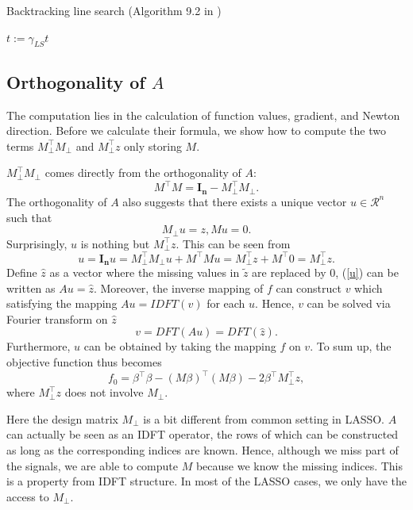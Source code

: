\documentclass[final,onefignum,onetabnum]{siamart190516}
\begin{document}
\begin{algorithm}[H]
\caption{Backtracking line search (Algorithm 9.2 in \cite{boyd2004convex})}
\label{alg: Backtrackingls}
\begin{algorithmic}
\STATE $t:=\gamma_{LS} t$
\ENDWHILE
\end{algorithmic}
\end{algorithm}
\subsection{Orthogonality of $A$}
The computation lies in the calculation of function values, gradient, and Newton direction. Before we calculate their formula, we show how to compute the two terms $M_{\perp}^{\top}M_{\perp}$ and $M_{\perp}^{\top}z$ only storing $M$.

$M_{\perp}^{\top}M_{\perp}$ comes directly from the orthogonality of $A$:
\begin{equation}
    M^{\top}M = \mathbf{I_n} -  M_{\perp}^{\top}M_{\perp}.
\end{equation}
The orthogonality of $A$ also suggests that there exists a unique vector $u\in \mathcal{R}^{n}$ such that
\begin{equation}\label{u}
    M_{\perp}u = z, Mu = 0.
\end{equation}
Surprisingly, $u$ is nothing but $M_{\perp}^{\top}z$. This can be seen from
\begin{equation}
    u = \mathbf{I_n}u = M_{\perp}^{\top} M_{\perp}u +  M^{\top}Mu = M_{\perp}^{\top}z + M^{\top}0 = M_{\perp}^{\top}z.
\end{equation}
Define $\widehat{z}$ as a vector where the missing values in $\widetilde{z}$ are replaced by 0, (\ref{u}) can be written as $Au = \widehat{z}$. Moreover, the inverse mapping of $f$ can construct $v$ which satisfying the mapping $Au = IDFT(v)$ for each $u$. Hence, $v$ can be solved via Fourier transform on $\widehat{z}$
\begin{equation}
    v = DFT(Au) = DFT(\widehat{z}).
\end{equation}
Furthermore, $u$ can be obtained by taking the mapping $f$ on $v$. To sum up, the objective function thus becomes
\begin{equation}
    f_0 = \beta^{\top}\beta - (M\beta)^{\top}(M\beta) -2\beta^{\top}M_{\perp}^{\top}z,
\end{equation}
where $M_{\perp}^{\top}z$ does not involve $M_{\perp}$.
\begin{remark}
Here the design matrix $M_{\perp}$ is a bit different from common setting in LASSO. $A$ can actually be seen as an IDFT operator, the rows of which can be constructed as long as the corresponding indices are known. Hence, although we miss part of the signals, we are able to compute $M$ because we know the missing indices. This is a property from IDFT structure. In most of the LASSO cases, we only have the access to $M_{\perp}$.
\end{remark}
\end{document}
